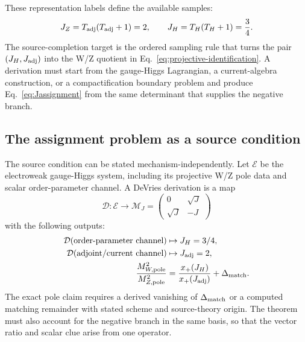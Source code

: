 These representation labels define the available samples:
\begin{equation}
  J_Z=T_{\rm adj}(T_{\rm adj}+1)=2,
  \qquad
  J_H=T_H(T_H+1)=\frac34 .
  \label{eq:adjoint-doublet-casimirs}
\end{equation}
The source-completion target is the ordered sampling rule that turns the pair
\((J_H,J_{\rm adj})\) into the W/Z quotient in
Eq.~\eqref{eq:projective-identification}.  A derivation must start from the
gauge-Higgs Lagrangian, a current-algebra construction, or a compactification
boundary problem and produce Eq.~\eqref{eq:Jassignment} from the same
determinant that supplies the negative branch.

\subsection{The assignment problem as a source condition}

The source condition can be stated mechanism-independently.  Let \(\mathcal E\) be the electroweak gauge-Higgs system, including its projective W/Z pole data and scalar order-parameter channel.  A DeVries derivation is a map
\begin{equation}
  \mathcal D:\mathcal E\longrightarrow \mathcal M_J
  =
  \begin{pmatrix}
  0 & \sqrt J\\
  \sqrt J & -J
  \end{pmatrix}
  \label{eq:assignment-map}
\end{equation}
with the following outputs:
\begin{align}
  \mathcal D(\text{order-parameter channel})&\mapsto J_H=3/4,\\
  \mathcal D(\text{adjoint/current channel})&\mapsto J_{\rm adj}=2,\\
  \frac{M_{W,\rm pole}^2}{M_{Z,\rm pole}^2}
  &=\frac{x_+(J_H)}{x_+(J_{\rm adj})}+\Delta_{\rm match}.
  \label{eq:assignment-outputs}
\end{align}
The exact pole claim requires a derived vanishing of \(\Delta_{\rm match}\) or
a computed matching remainder with stated scheme and source-theory origin.  The
theorem must also account for the negative branch in the same basis, so that
the vector ratio and scalar clue arise from one operator.

